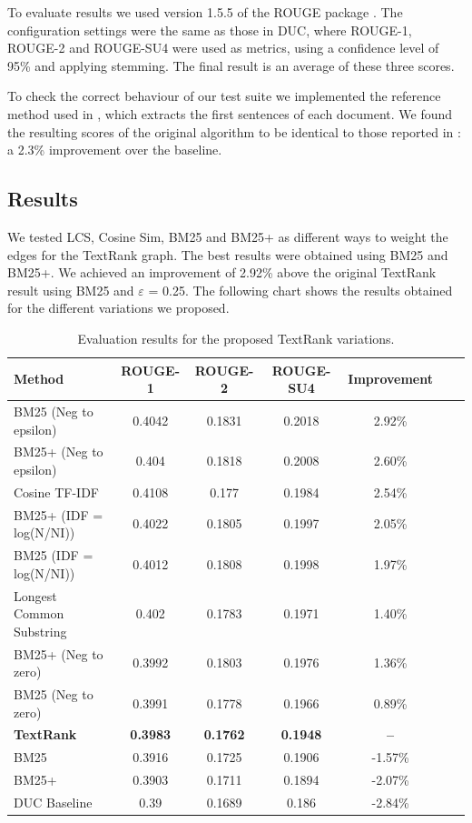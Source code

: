 \documentclass{llncs}
\begin{document}
To evaluate results we used version 1.5.5 of the ROUGE package \cite{Lin2004a}. The configuration settings were the same as those in DUC, where ROUGE-1, ROUGE-2 and ROUGE-SU4 were used as metrics, using a confidence level of 95\% and applying stemming. The final result is an average of these three scores.

To check the correct behaviour of our test suite we implemented the reference method used in \cite{mihalcea-tarau}, which extracts the first sentences of each document. We found the resulting scores of the original algorithm to be identical to those reported in \cite{mihalcea-tarau}: a 2.3\% improvement over the baseline.


\subsection{Results}
We tested LCS, Cosine Sim, BM25 and BM25+ as different ways to weight the edges for the TextRank graph. 
The best results were obtained using BM25 and BM25+. We achieved an improvement of 2.92\% above the original TextRank result using BM25 and $\varepsilon$ = 0.25. The following chart shows the results obtained for the different variations we proposed.

\begin{table}
\caption{Evaluation results for the proposed TextRank variations.}
\begin{center}
\begin{tabular}{l*{5}{c}r}
\hline
\rule{0pt}{12pt}
Method & ROUGE-1 & ROUGE-2 & ROUGE-SU4 & Improvement \\[2pt]
\hline\rule{0pt}{12pt}\mbox{}\par\nobreak
BM25 (Neg to epsilon) & 0.4042 & 0.1831 & 0.2018 & 2.92\% \\
BM25+ (Neg to epsilon) & 0.404 & 0.1818 & 0.2008 & 2.60\% \\
Cosine TF-IDF & 0.4108 & 0.177 & 0.1984 & 2.54\% \\
BM25+ (IDF = log(N/NI)) & 0.4022 & 0.1805 & 0.1997 & 2.05\% \\ 
BM25 (IDF = log(N/NI)) & 0.4012 & 0.1808 & 0.1998 & 1.97\% \\ 
Longest Common Substring & 0.402 & 0.1783 & 0.1971 & 1.40\% \\
BM25+ (Neg to zero) & 0.3992 & 0.1803 & 0.1976 & 1.36\% \\ 
BM25 (Neg to zero) & 0.3991 & 0.1778 & 0.1966 & 0.89\% \\
\textbf{TextRank} & \textbf{0.3983} & \textbf{0.1762} & \textbf{0.1948} & \textbf{--}\\
BM25 & 0.3916 & 0.1725 & 0.1906 & -1.57\% \\
BM25+ & 0.3903 & 0.1711 & 0.1894 & -2.07\% \\
DUC Baseline & 0.39 & 0.1689 & 0.186 & -2.84\% \\ [2pt]
\hline
\end{tabular}
\end{center}
\end{table}
\end{document}
